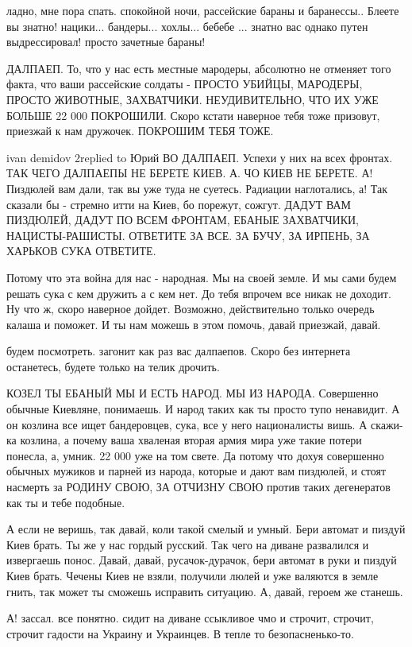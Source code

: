 ладно, мне пора спать. спокойной ночи, рассейские бараны и баранессы.. Блеете
вы знатно! нацики... бандеры... хохлы... бебебе ... знатно вас однако путен
выдрессировал! просто зачетные бараны!

ДАЛПАЕП. То, что у нас есть местные мародеры, абсолютно не отменяет того факта,
что ваши рассейские солдаты - ПРОСТО УБИЙЦЫ, МАРОДЕРЫ, ПРОСТО ЖИВОТНЫЕ,
ЗАХВАТЧИКИ. НЕУДИВИТЕЛЬНО, ЧТО ИХ УЖЕ БОЛЬШЕ 22 000 ПОКРОШИЛИ. Скоро кстати
наверное тебя тоже призовут, приезжай к нам дружочек. ПОКРОШИМ ТЕБЯ ТОЖЕ.

ivan demidov 2replied to Юрий ВО ДАЛПАЕП. Успехи у них на всех фронтах. ТАК
ЧЕГО ДАЛПАЕПЫ НЕ БЕРЕТЕ КИЕВ. А. ЧО КИЕВ НЕ БЕРЕТЕ. А! Пиздюлей вам дали, так
вы уже туда не суетесь. Радиации наглотались, а! Так сказали бы - стремно итти
на Киев, бо порежут, сожгут. ДАДУТ ВАМ ПИЗДЮЛЕЙ, ДАДУТ ПО ВСЕМ ФРОНТАМ, ЕБАНЫЕ
ЗАХВАТЧИКИ, НАЦИСТЫ-РАШИСТЫ. ОТВЕТИТЕ ЗА ВСЕ. ЗА БУЧУ, ЗА ИРПЕНЬ, ЗА ХАРЬКОВ
СУКА ОТВЕТИТЕ.

Потому что эта война для нас - народная. Мы на своей земле. И мы сами будем
решать сука с кем дружить а с кем нет. До тебя впрочем все никак не доходит. Ну
что ж, скоро наверное дойдет. Возможно, действительно только очередь калаша и
поможет. И ты нам можешь в этом помочь, давай приезжай, давай.

будем посмотреть. загонит как раз вас далпаепов. Скоро без интернета
останетесь, будете только на телик дрочить.

КОЗЕЛ ТЫ ЕБАНЫЙ МЫ И ЕСТЬ НАРОД. МЫ ИЗ НАРОДА. Совершенно обычные Киевляне,
понимаешь. И народ таких как ты просто тупо ненавидит. А он козлина все ищет
бандеровцев, сука, все у него националисты вишь. А скажи-ка козлина, а почему
ваша хваленая вторая армия мира уже такие потери понесла, а, умник. 22 000 уже
на том свете. Да потому что дохуя совершенно обычных мужиков и парней из
народа, которые и дают вам пиздюлей, и стоят насмерть за РОДИНУ СВОЮ, ЗА
ОТЧИЗНУ СВОЮ против таких дегенератов как ты и тебе подобные.

А если не веришь, так давай, коли такой смелый и умный. Бери автомат и пиздуй
Киев брать. Ты же у нас гордый русский. Так чего на диване развалился и
извергаешь понос. Давай, давай, русачок-дурачок, бери автомат в руки и пиздуй
Киев брать. Чечены Киев не взяли, получили люлей и уже валяются в земле гнить,
так может ты сможешь исправить ситуацию. А, давай, героем же станешь.

А! зассал. все понятно. сидит на диване ссыкливое чмо и строчит, строчит,
строчит гадости на Украину и Украинцев. В тепле то безопасненько-то.
